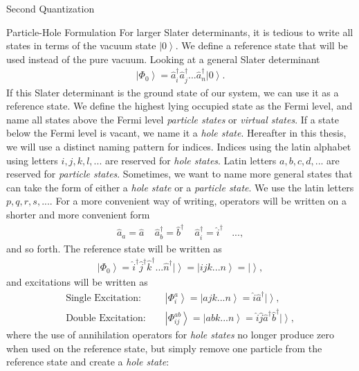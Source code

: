 \documentclass[twoside,english]{uiofysmaster}
\begin{document}
\begin{chapter}{Second Quantization}
	\begin{section}{Particle-Hole Formulation}
		For larger Slater determinants, it is tedious to write all states in terms of the vacuum state $\left| 0 \right>$. We define a reference state that will be used instead of the pure vacuum. Looking at a general Slater determinant
		\begin{align}
			\left| \Phi_0 \right> = \hat a_i^\dagger \hat a_j^\dagger ... \hat a_n^\dagger \left| 0 \right>.
		\end{align}
		If this Slater determinant is the ground state of our system, we can use it as a reference state. We define the highest lying occupied state as the Fermi level, and name all states above the Fermi level \textit{particle states} or \textit{virtual states}. If a state below the Fermi level is vacant, we name it a \textit{hole state}. Hereafter in this thesis, we will use a distinct naming pattern for indices. Indices using the latin alphabet using letters $i, j, k, l, ...$ are reserved for \textit{hole states}. Latin letters $a, b, c, d, ...$ are reserved for \textit{particle states}. Sometimes, we want to name more general states that can take the form of either a \textit{hole state} or a \textit{particle state}. We use the latin letters $p, q, r, s, ...$. For a more convenient way of writing, operators will be written on a shorter and more convenient form
		\begin{align}
			\hat a_a = \hat a \:\:\:\:\: \hat a_b^\dagger = \hat b^\dagger \:\:\:\:\: \hat a_i^\dagger = \hat i^\dagger \:\:\:\: ... ,
		\end{align}
		and so forth. The reference state will be written as 
		\begin{align}
			\left| \Phi_0 \right> = \hat i^\dagger \hat j^\dagger \hat k^\dagger ... \hat n^\dagger \left| \right> = \left| ijk ... n \right> = \left| \right>,
		\end{align}
		and excitations will be written as
		\begin{align}
			\text{Single Excitation: }\:\:\:\:& \left| \Phi_i^a \right> = \left| ajk ... n \right> = \hat i \hat a^\dagger \left| \right>, \\
			\text{Double Excitation: }\:\:\:\:& \left| \Phi_{ij}^{ab} \right> = \left| abk ... n \right> = \hat i \hat j \hat a^\dagger \hat b^\dagger \left| \right> ,
		\end{align}
		where the use of annihilation operators for \textit{hole states} no longer produce zero when used on the reference state, but simply remove one particle from the reference state and create a \textit{hole state}:

\end{section}
\end{chapter}
\end{document}
